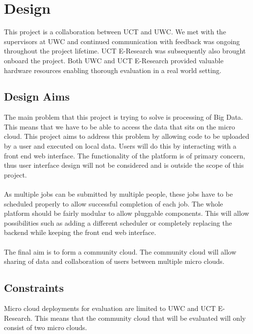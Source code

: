 \documentclass{sig-alternate-05-2015}
\begin{document}
\section{Design}
This project is a collaboration between UCT and UWC. We met with the supervisors at UWC and continued communication with feedback was ongoing throughout the project lifetime. UCT E-Research was subsequently also brought onboard the project. Both UWC and UCT E-Research provided valuable hardware resources enabling thorough evaluation in a real world setting.

\subsection{Design Aims}
The main problem that this project is trying to solve is processing of Big Data. This means that we have to be able to access the data that sits on the micro cloud. This project aims to address this problem by allowing code to be uploaded by a user and executed on local data. Users will do this by interacting with a front end web interface. The functionality of the platform is of primary concern, thus user interface design will not be considered and is outside the scope of this project. 
\\\\
As multiple jobs can be submitted by multiple people, these jobs have to be scheduled properly to allow successful completion of each job. The whole platform should be fairly modular to allow pluggable components. This will allow possibilities such as adding a different scheduler or completely replacing the backend while keeping the front end web interface.
\\\\
The final aim is to form a community cloud. The community cloud will allow sharing of data and collaboration of users between multiple micro clouds.

\subsection{Constraints}
Micro cloud deployments for evaluation are limited to UWC and UCT E-Research. This means that the community cloud that will be evaluated will only consist of two micro clouds.
\end{document}
